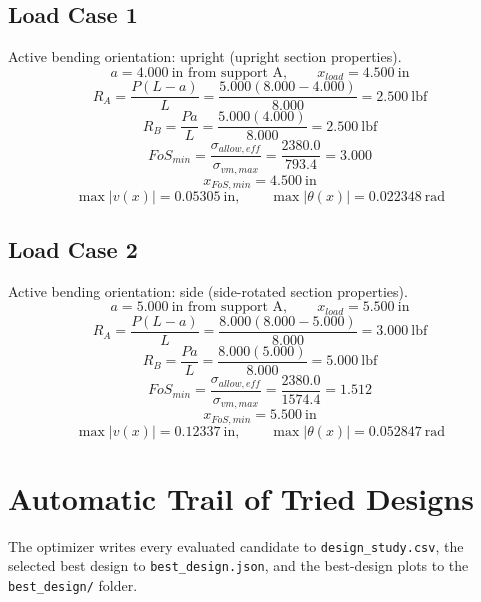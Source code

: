 \documentclass[11pt]{article}
\begin{document}
\subsection*{Load Case 1}
Active bending orientation: upright (upright section properties).
\[a = 4.000\ \mathrm{in} \text{ from support A}, \qquad x_{load} = 4.500\ \mathrm{in}\]
\[R_A = \frac{P(L-a)}{L} = \frac{5.000(8.000-4.000)}{8.000} = 2.500\ \mathrm{lbf}\]
\[R_B = \frac{Pa}{L} = \frac{5.000(4.000)}{8.000} = 2.500\ \mathrm{lbf}\]
\[FoS_{min} = \frac{\sigma_{allow,eff}}{\sigma_{vm,max}} = \frac{2380.0}{793.4} = 3.000\]
\[x_{FoS,min} = 4.500\ \mathrm{in}\]
\[\max |v(x)| = 0.05305\ \mathrm{in}, \qquad \max |\theta(x)| = 0.022348\ \mathrm{rad}\]
\subsection*{Load Case 2}
Active bending orientation: side (side-rotated section properties).
\[a = 5.000\ \mathrm{in} \text{ from support A}, \qquad x_{load} = 5.500\ \mathrm{in}\]
\[R_A = \frac{P(L-a)}{L} = \frac{8.000(8.000-5.000)}{8.000} = 3.000\ \mathrm{lbf}\]
\[R_B = \frac{Pa}{L} = \frac{8.000(5.000)}{8.000} = 5.000\ \mathrm{lbf}\]
\[FoS_{min} = \frac{\sigma_{allow,eff}}{\sigma_{vm,max}} = \frac{2380.0}{1574.4} = 1.512\]
\[x_{FoS,min} = 5.500\ \mathrm{in}\]
\[\max |v(x)| = 0.12337\ \mathrm{in}, \qquad \max |\theta(x)| = 0.052847\ \mathrm{rad}\]

\section*{Automatic Trail of Tried Designs}
The optimizer writes every evaluated candidate to \texttt{design\_study.csv}, the selected best design to \texttt{best\_design.json}, and the best-design plots to the \texttt{best\_design/} folder.
\end{document}
